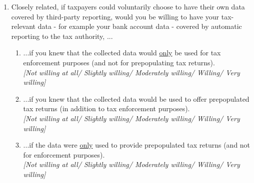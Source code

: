 \documentclass[11pt]{article}
\begin{document}
\begin{enumerate}[resume]
    \item \label{question:volunarydisclosure} Closely related, if taxpayers could voluntarily choose to have their own data covered by third-party reporting, would you be willing to have your tax-relevant data - for example your bank account data - covered by automatic reporting to the tax authority, ...   \\
    \begin{enumerate}
    \item ...if you knew that the collected data would \underline{only} be used for tax enforcement  purposes (and not for prepopulating tax returns). \\     \textit{[Not willing at all/ Slightly willing/ Moderately willing/ Willing/ Very willing]}
    \item ...if you knew that the collected data would be used to offer prepopulated tax returns (in addition to tax enforcement purposes). \\     \textit{[Not willing at all/ Slightly willing/ Moderately willing/ Willing/ Very willing]}
    \item ...if the data were \underline{only} used to provide prepopulated tax returns (and not for enforcement purposes). \\     \textit{[Not willing at all/ Slightly willing/ Moderately willing/ Willing/ Very willing]}
\end{enumerate}
\end{enumerate}
\end{document}

